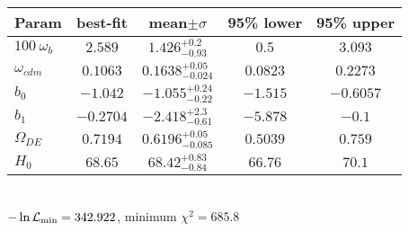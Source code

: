 \begin{tabular}{|l|c|c|c|c|} 
 \hline 
Param & best-fit & mean$\pm\sigma$ & 95\% lower & 95\% upper \\ \hline 
$100~\omega_{b }$ &$2.589$ & $1.426_{-0.93}^{+0.2}$ & $0.5$ & $3.093$ \\ 
$\omega_{cdm }$ &$0.1063$ & $0.1638_{-0.024}^{+0.05}$ & $0.0823$ & $0.2273$ \\ 
$b_{0 }$ &$-1.042$ & $-1.055_{-0.22}^{+0.24}$ & $-1.515$ & $-0.6057$ \\ 
$b_{1 }$ &$-0.2704$ & $-2.418_{-0.61}^{+2.3}$ & $-5.878$ & $-0.1$ \\ 
$\Omega_{DE}$ &$0.7194$ & $0.6196_{-0.085}^{+0.05}$ & $0.5039$ & $0.759$ \\ 
$H_{0 }$ &$68.65$ & $68.42_{-0.84}^{+0.83}$ & $66.76$ & $70.1$ \\ 
\hline 
 \end{tabular} \\ 
$-\ln{\cal L}_\mathrm{min} =342.922$, minimum $\chi^2=685.8$ \\ 
